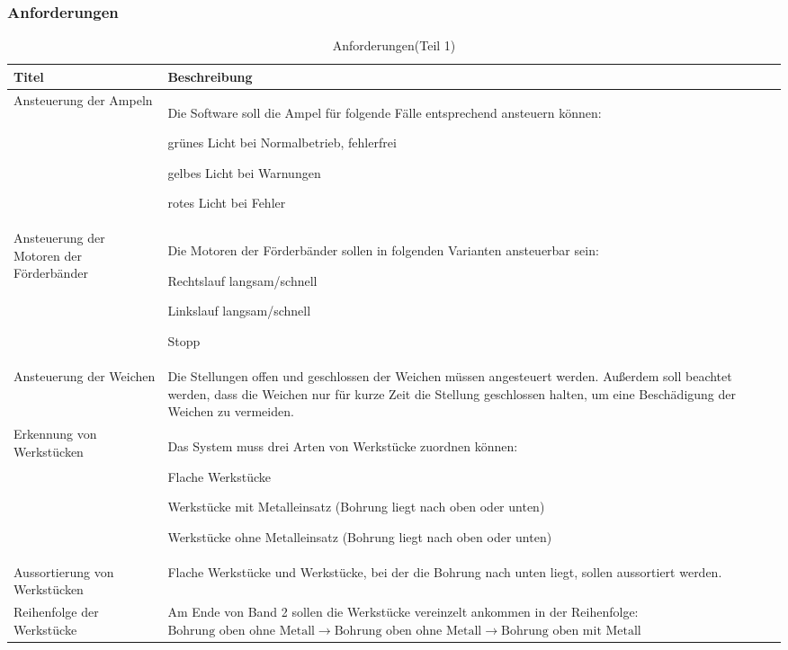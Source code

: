 \documentclass[a4paper, 11pt]{article}
\newcommand{\su}{\glqq} %
\newcommand{\so}{\grqq\xspace} %
\begin{document}
\newpage

\subsubsection{Anforderungen}
\begin{table}[h]
\center
\begin{tabularx}{\textwidth}{|X|X|}
\hline
\textbf{Titel}&\textbf{Beschreibung}\\
\hline
Ansteuerung der Ampeln&Die Software soll die Ampel für folgende Fälle entsprechend ansteuern können:
\begin{compactenum}[-]
\item grünes Licht bei Normalbetrieb, fehlerfrei 
\item gelbes Licht bei Warnungen 
\item rotes Licht bei Fehler 
\end{compactenum}\\
\hline
Ansteuerung der Motoren der Förderbänder&Die Motoren der Förderbänder sollen in folgenden Varianten ansteuerbar sein: 
\begin{compactenum}[-]
\item Rechtslauf langsam/schnell
\item Linkslauf langsam/schnell
\item Stopp
\end{compactenum}\\
\hline
Ansteuerung der Weichen&Die Stellungen \su offen\so und \su geschlossen\so der Weichen müssen angesteuert werden. Außerdem soll beachtet werden, dass die Weichen nur für kurze Zeit die Stellung \su geschlossen\so halten, um eine Beschädigung der Weichen zu vermeiden.\\
\hline
Erkennung von Werkstücken&Das System muss drei Arten von Werkstücke zuordnen können: 
\begin{compactenum}[-]
\item Flache Werkstücke 
\item Werkstücke mit Metalleinsatz (Bohrung liegt nach oben oder unten) 
\item Werkstücke ohne Metalleinsatz (Bohrung liegt nach oben oder unten)
\end{compactenum}\\
\hline
Aussortierung von Werkstücken&Flache Werkstücke und Werkstücke, bei der die Bohrung nach unten liegt, sollen aussortiert werden. \\
\hline
Reihenfolge der Werkstücke&Am Ende von Band 2 sollen die Werkstücke vereinzelt ankommen in der Reihenfolge:\hspace{2cm}
$\text{Bohrung oben ohne Metall}\rightarrow \text{Bohrung oben ohne Metall}\rightarrow \text{Bohrung oben mit Metall}$ \\
\hline
\end{tabularx}
\caption{Anforderungen(Teil 1)}
\label{anf1}
\end{table}
\end{document}
